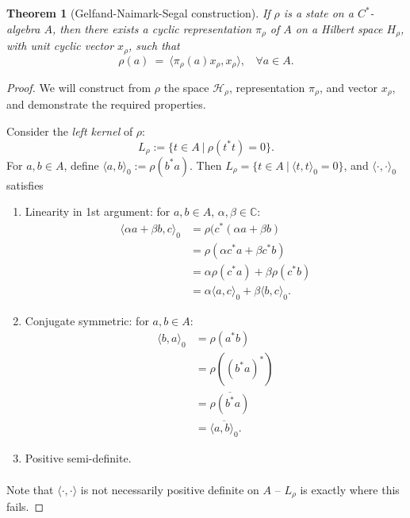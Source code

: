 \documentclass[12pt,a4paper]{amsart}
\theoremstyle{plain}
\newtheorem{thm}{Theorem}
\theoremstyle{definition}
\newcommand{\Hr}{\mathcal{H}_\rho}
\newcommand{\1}{\mathbbm{1}}
\begin{document}
\begin{thm} [Gelfand-Naimark-Segal construction]
	If $\rho$ is a state on a $C^\ast$-algebra $A$, then there exists a cyclic representation 
	$\pi_\rho$ of $A$ on a Hilbert space ${H}_\rho$, with unit cyclic vector $x_\rho$, such that 
	\[ 
		\rho(a)~=~ \langle \pi_\rho (a) x_\rho, x_\rho \rangle, ~~~~ \forall a \in A.
	\]
\end{thm}
\begin{proof}
	We will construct from $\rho$ the space $\Hr$,  representation $\pi_\rho$, 
	and vector $x_\rho$, and demonstrate the required properties.
	
	Consider the \emph{left kernel} of $\rho$:
	\[
		L_\rho := \{t \in A ~|~ \rho (t ^\ast t) = 0 \}.
	\]	
	For $a,b \in A$, define $\langle a , b \rangle_0 := \rho(b^\ast a)$.
	Then $L_\rho = \{t\in A ~|~ \langle t , t \rangle _0 = 0 \} $, and 
	$\langle \cdot, \cdot \rangle_0$ satisfies
	\begin{enumerate}[label=(\roman*)]
	  \item Linearity in 1st argument: for $a,b\in A$, $\alpha, \beta \in \mathbb{C}$:
		\begin{align*}
		   \langle \alpha a + \beta b, c \rangle_0 
		&= \rho (c^\ast(\alpha a + \beta b)   								\\
		&= \rho (\alpha c^\ast a + \beta c^\ast b)  						\\
		&= \alpha \rho (c^\ast a) + \beta \rho (c^\ast b)					\\
		&= \alpha \langle a , c \rangle_0 + \beta \langle b, c \rangle_0.
		\end{align*}
	  \item Conjugate symmetric: for $a,b \in A$:
	  	\begin{align*}
	  	   \langle b,a \rangle _0 
	  	&= \rho (a^\ast b)													\\
	  	&= \rho ((b^\ast a)^\ast)											\\
	  	&= \overline{\rho (b^\ast a)}										\\
	  	&= \overline{\langle a,b \rangle _0 }.
	  	\end{align*}
	  \item Positive semi-definite.  %
	  	\begin{align*}
	  	\end{align*}
	\end{enumerate}
	Note that $\langle \cdot, \cdot \rangle$ is not necessarily positive definite on 
	$A$ -- $L_\rho$ is exactly where this fails.
	

\end{proof}
\end{document}
